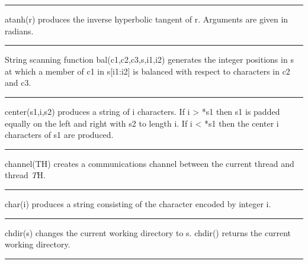 \bigskip\hrule\vspace{0.1cm}

\noindent
{}\textsf{atanh(r)} produces the inverse
hyperbolic tangent of \textsf{r}. Arguments are given in radians.

\bigskip\hrule\vspace{0.1cm}

\noindent
{}String scanning function
\textsf{bal(c1,c2,c3,s,i1,i2)} generates the integer positions in
\textsf{s} at which a member of \textsf{c1} in \textsf{s[i1:i2]} is
balanced with respect to characters in \textsf{c2} and \textsf{c3}.

\bigskip\hrule\vspace{0.1cm}

\noindent
{}\textsf{center(s1,i,s2)} produces a
string of \textsf{i} characters. If \textsf{i {\textgreater} *s1} then
\textsf{s1} is padded equally on the left and right with \textsf{s2} to
length \textsf{i}. If \textsf{i {\textless} *s1} then the center
\textsf{i} characters of \textsf{s1} are produced.

\bigskip\hrule\vspace{0.1cm}

\noindent
{}\textsf{channel(TH)} creates a communications channel
between the current thread and thread {\textit TH}.

\bigskip\hrule\vspace{0.1cm}

\noindent
{}\textsf{char(i)} produces a string consisting of the
character encoded by integer \textsf{i}.

\bigskip\hrule\vspace{0.1cm}

\noindent
{}\textsf{chdir(s)} changes the current
working directory to \textsf{s}. \textsf{chdir()} returns the current
working directory.

\bigskip\hrule\vspace{0.1cm}

